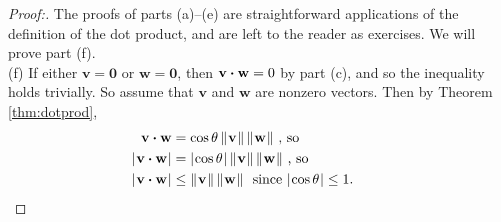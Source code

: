 \begin{proofbar}\begin{proof}[Proof:]
 The proofs of parts (a)--(e) are straightforward applications of the definition of the dot product, and are left
 to the reader as exercises. We will prove part (f).\\(f)
 If either $\mathbf{v} = \mathbf{0}$ or $\mathbf{w} = \mathbf{0}$, then $\mathbf{v} \bm{\cdot} \mathbf{w} = 0$
 by part (c), and so the inequality holds trivially. 
 So assume that $\mathbf{v}$ and $\mathbf{w}$ are nonzero vectors.
 Then by Theorem \ref{thm:dotprod},
 \begin{align*}
  \mathbf{v} \bm{\cdot} \mathbf{w} &= \cos \theta \, \lVert\mspace{1mu}\mathbf{v}\mspace{1mu}\rVert\,\lVert\mspace{1mu}\mathbf{w}\mspace{1mu}\rVert \text{~,~so}\\
  \lvert\mspace{1mu}\mathbf{v} \bm{\cdot} \mathbf{w}\mspace{1mu}\rvert &= \lvert\mspace{1mu}\cos \theta\mspace{1mu}\rvert \, \lVert\mspace{1mu}\mathbf{v}\mspace{1mu}\rVert\,\lVert\mspace{1mu}\mathbf{w}\mspace{1mu}\rVert \text{~,~so}\\
  \lvert\mspace{1mu}\mathbf{v} \bm{\cdot} \mathbf{w}\mspace{1mu}\rvert &\le \lVert\mspace{1mu}\mathbf{v}\mspace{1mu}\rVert\,\lVert\mspace{1mu}\mathbf{w}\mspace{1mu}\rVert
   \text{~~since $\lvert\mspace{1mu}\cos \theta\mspace{1mu}\rvert \le 1$. \qquad \qedhere}
 \end{align*}
\end{proof}\end{proofbar}

